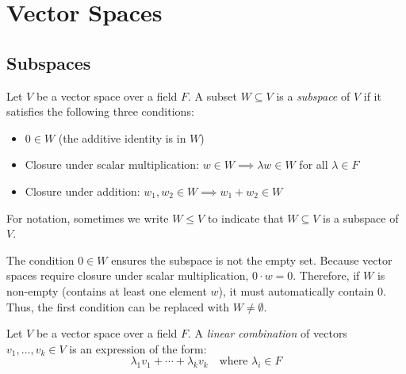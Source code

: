 \documentclass[../linear_algebra_and_groups.tex]{subfiles}
\begin{document}
\chapter{Vector Spaces}

\section{Subspaces}

\begin{definition}[Subspace]
    \begin{shaded*}
        Let $V$ be a vector space over a field $F$. A subset $W\subseteq V$ is a \textit{subspace} of $V$ if it satisfies the following three conditions:
        \begin{itemize}
            \item $0\in W$ (the additive identity is in $W$)
            \item Closure under scalar multiplication: $w\in W\implies \lambda w\in W$ for all $\lambda\in F$
            \item Closure under addition: $w_1,w_2\in W\implies w_1+w_2\in W$
        \end{itemize}
    \end{shaded*}
\end{definition}

For notation, sometimes we write $W\le V$ to indicate that $W\subseteq V$ is a subspace of $V$.


\begin{remark}
    The condition $0\in W$ ensures the subspace is not the empty set. Because vector spaces require closure under scalar multiplication, $0 \cdot w = 0$. Therefore, if $W$ is non-empty (contains at least one element $w$), it must automatically contain $0$. Thus, the first condition can be replaced with $W \ne \emptyset$.
\end{remark}

\begin{definition}
    \begin{shaded*}
       Let $V$ be a vector space over a field $F$. A \textit{linear combination} of vectors $v_1,\dots,v_k\in V$ is an expression of the form:
        \[ \lambda_1v_1+\cdots+\lambda_kv_k \quad \text{where } \lambda_i\in F \]
    \end{shaded*}
\end{definition}
\end{document}
